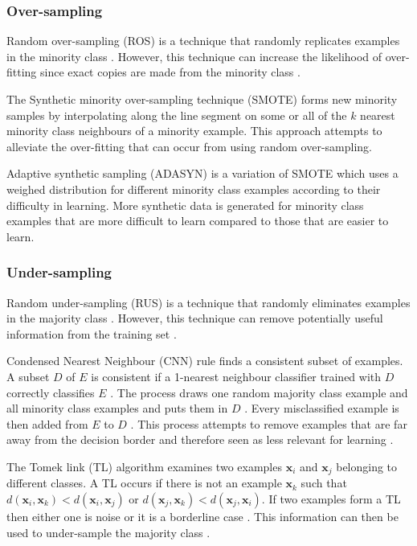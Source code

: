 \documentclass{sig-alternate-05-2015}
\begin{document}
	\subsubsection{Over-sampling}
	Random over-sampling (ROS) is a technique that randomly replicates examples in the minority class \cite{Batista:2004:SBS:1007730.1007735}. However, this technique can increase the likelihood of over-fitting since exact copies are made from the minority class \cite{Batista:2004:SBS:1007730.1007735}.
	
	The Synthetic minority over-sampling technique (SMOTE) \cite{Chawla:2002:SSM:1622407.1622416} forms new minority samples by interpolating along the line segment on some or all of the $k$ nearest minority class neighbours of a minority example. This approach attempts to alleviate the over-fitting that can occur from using random over-sampling.
	
	Adaptive synthetic sampling (ADASYN) \cite{4633969} is a variation of SMOTE which uses a weighed distribution for different minority class examples according to their difficulty in learning. More synthetic data is generated for minority class examples that are more difficult to learn compared to those that are easier to learn.
	
	\subsubsection{Under-sampling}
	Random under-sampling (RUS) is a technique that randomly eliminates examples in the majority class \cite{Batista:2004:SBS:1007730.1007735}. However, this technique can remove potentially useful information from the training set \cite{Batista:2004:SBS:1007730.1007735}. 
	
	Condensed Nearest Neighbour (CNN) rule \cite{1056066} finds a consistent subset of examples. A subset $D$ of $E$ is consistent if a 1-nearest neighbour classifier trained with $D$ correctly classifies $E$ \cite{Batista:2004:SBS:1007730.1007735}. The process draws one random majority class example and all minority class examples and puts them in $D$ \cite{Batista:2004:SBS:1007730.1007735}. Every misclassified example is then added from $E$ to $D$ \cite{Batista:2004:SBS:1007730.1007735}. This process attempts to remove examples that are far away from the decision border and therefore seen as less relevant for learning \cite{Batista:2004:SBS:1007730.1007735}.
	
	The Tomek link (TL) algorithm \cite{4309452} examines two examples $\textbf{x}_i$ and $\textbf{x}_j$ belonging to different classes. A TL occurs if there is not an example $\textbf{x}_k$ such that $d(\textbf{x}_i, \textbf{x}_k) < d(\textbf{x}_i, \textbf{x}_j)$ or $d(\textbf{x}_j, \textbf{x}_k) < d(\textbf{x}_j, \textbf{x}_i)$. If two examples form a TL then either one is noise or it is a borderline case \cite{Batista:2004:SBS:1007730.1007735}. This information can then be used to under-sample the majority class \cite{Batista:2004:SBS:1007730.1007735}.
	
\end{document}
